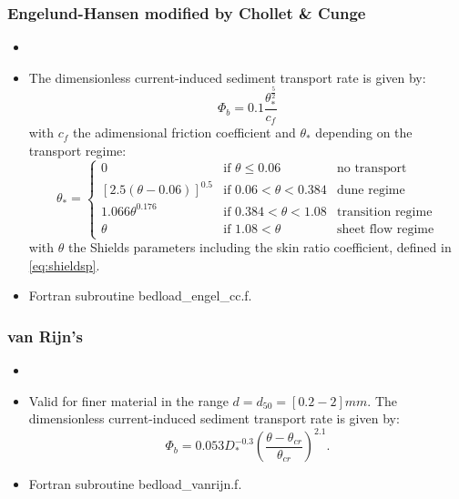 \subsubsection{Engelund-Hansen modified by Chollet \& Cunge}
\begin{itemize}
 \item {}
 \item The dimensionless current-induced sediment transport rate is given by:
  \begin{equation*}
  \Phi_b=0.1 \frac{\theta_*^{\frac{5}{2}}}{c_f}
  \end{equation*}
 with $c_f$ the adimensional friction coefficient and $\theta_*$ depending on the transport regime:
\begin{equation*}
\theta_*=\left\{\begin{array}{lll}
0 & \text{if}\,\,\theta \leq 0.06 & \text{no transport}  \\
\left[2.5\left(\theta-0.06\right)\right]^{0.5} & \text{if}\,\,0.06<\theta <0.384 & \text{dune regime}\\
1.066\theta^{0.176} & \text{if}\,\,0.384<\theta <1.08 & \text{transition regime}\\
\theta & \text{if}\,\,1.08<\theta & \text{sheet flow regime}
\end{array}
\right.
\end{equation*}
with $\theta$ the Shields parameters including the skin ratio coefficient, defined in \eqref{eq:shieldsp}.
\item Fortran subroutine {\ttfamily bedload\_engel\_cc.f}.
\end{itemize}

\subsubsection{van Rijn's}
\begin{itemize}
\item {}
\item Valid for finer material in the range $d = d_{50} = [0.2-2]mm$. The dimensionless current-induced sediment transport rate is given by:
\begin{equation*}
\Phi_b = 0.053 D_*^{-0.3} \left( \frac{\theta-\theta_{cr}}{\theta_{cr}} \right)^{2.1}.
\end{equation*}

\item Fortran subroutine {\ttfamily bedload\_vanrijn.f}.
\end{itemize}

